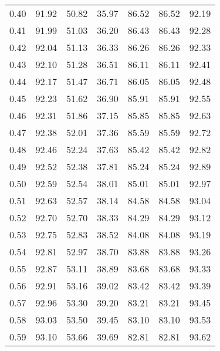 \begin{tabular}{|c|c|c|c|c|c|c|}
      0.40 &     91.92 &     50.82 &      35.97 &   86.52 &      86.52 &         92.19 \\
      0.41 &     91.99 &     51.03 &      36.20 &   86.43 &      86.43 &         92.28 \\
      0.42 &     92.04 &     51.13 &      36.33 &   86.26 &      86.26 &         92.33 \\
      0.43 &     92.10 &     51.28 &      36.51 &   86.11 &      86.11 &         92.41 \\
      0.44 &     92.17 &     51.47 &      36.71 &   86.05 &      86.05 &         92.48 \\
      0.45 &     92.23 &     51.62 &      36.90 &   85.91 &      85.91 &         92.55 \\
      0.46 &     92.31 &     51.86 &      37.15 &   85.85 &      85.85 &         92.63 \\
      0.47 &     92.38 &     52.01 &      37.36 &   85.59 &      85.59 &         92.72 \\
      0.48 &     92.46 &     52.24 &      37.63 &   85.42 &      85.42 &         92.82 \\
      0.49 &     92.52 &     52.38 &      37.81 &   85.24 &      85.24 &         92.89 \\
      0.50 &     92.59 &     52.54 &      38.01 &   85.01 &      85.01 &         92.97 \\
      0.51 &     92.63 &     52.57 &      38.14 &   84.58 &      84.58 &         93.04 \\
      0.52 &     92.70 &     52.70 &      38.33 &   84.29 &      84.29 &         93.12 \\
      0.53 &     92.75 &     52.83 &      38.52 &   84.08 &      84.08 &         93.19 \\
      0.54 &     92.81 &     52.97 &      38.70 &   83.88 &      83.88 &         93.26 \\
      0.55 &     92.87 &     53.11 &      38.89 &   83.68 &      83.68 &         93.33 \\
      0.56 &     92.91 &     53.16 &      39.02 &   83.42 &      83.42 &         93.39 \\
      0.57 &     92.96 &     53.30 &      39.20 &   83.21 &      83.21 &         93.45 \\
      0.58 &     93.03 &     53.50 &      39.45 &   83.10 &      83.10 &         93.53 \\
      0.59 &     93.10 &     53.66 &      39.69 &   82.81 &      82.81 &         93.62 \\

\end{tabular}
